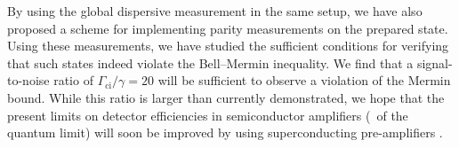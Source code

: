 By using the global dispersive measurement in the same setup, we have also proposed a scheme for implementing parity measurements on the prepared state. Using these measurements, we have studied the sufficient conditions for verifying that such states indeed violate the Bell--Mermin inequality. We find that a signal-to-noise ratio of $\Gamma_\text{ci}/\gamma=20$  will be sufficient to observe a violation of the Mermin bound. While this ratio is larger than currently demonstrated, we hope that the present limits on detector efficiencies in semiconductor amplifiers (\ of the quantum limit) will soon be improved by using superconducting pre-amplifiers \cite{bergeal_analog_2008}.
